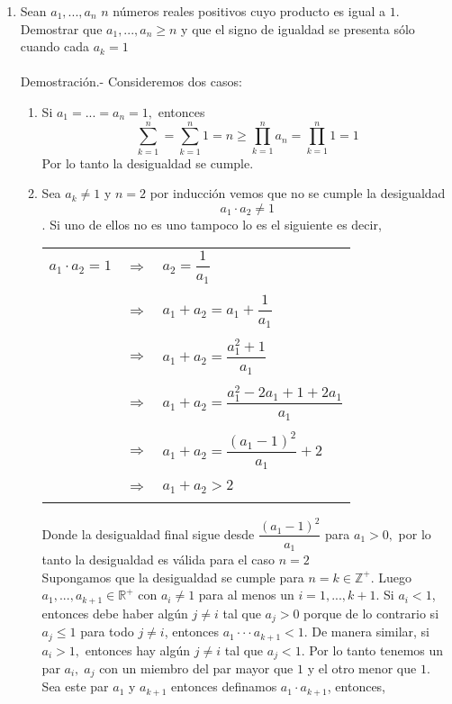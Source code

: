 \begin{enumerate}
\item Sean $a_1,...,a_n$  $n$ números reales positivos cuyo producto es igual a $1$. Demostrar que $a_1,...,a_n \geq n$ y que el signo de igualdad se presenta sólo cuando cada $a_k =1$\\\\
Demostración.- \; Consideremos dos casos:
\begin{enumerate}[C1]
\item Si $a_1=...=a_n=1,$ entonces 
$$\sum\limits_{k=1}^n = \sum\limits_{k=1}^n 1 = n \geq \prod\limits_{k=1}^n a_n = \prod\limits_{k=1}^n 1 = 1 $$
Por lo tanto la desigualdad se cumple.
\item Sea $a_k \neq 1$ y $n=2$ por inducción vemos que no se cumple la desigualdad $$a_1 \cdot a_2 \neq 1$$. Si uno de ellos no es uno tampoco lo es el siguiente es decir,
\begin{center}
\begin{tabular}{rcl}
$a_1 \cdot a_2 = 1$&$\Rightarrow$&$a_2 = \dfrac{1}{a_1}$\\\\
&$\Rightarrow$&$a_1 + a_2 = a_1 + \dfrac{1}{a_1}$\\\\
&$\Rightarrow$&$a_1 + a_2=\dfrac{a_1^2 + 1}{a_1}$\\\\
&$\Rightarrow$&$a_1 + a_2=\dfrac{a_1^2 - 2a_1 + 1 +2a_1}{a_1}$\\\\
&$\Rightarrow$&$a_1 + a_2=\dfrac{(a_1 - 1)^2}{a_1} + 2$\\\\
&$\Rightarrow$&$a_1 + a_2 > 2$\\\\
\end{tabular}
\end{center}
Donde la desigualdad final sigue desde $\dfrac{(a_1-1)^2}{a_1}$ para $a_1>0,$ por lo tanto la desigualdad es válida para el caso $n=2$\\
Supongamos que la desigualdad se cumple para $n=k \in \mathbb{Z}^+$. Luego $a_1,...,a_{k+1} \in \mathbb{R}^+$ con $a_i \neq 1$ para al menos un $i=1,...,k+1.$ Si $a_i < 1$, entonces debe haber algún $j\neq i$ tal que $a_j > 0$ porque de lo contrario si $a_j \leq 1$ para  todo $j\neq i$, entonces $a_1 \cdot \cdot \cdot a_{k+1}<1.$ De manera similar, si $a_i>1,$ entonces hay algún $j\neq i$ tal que $a_j <1.$ Por lo tanto tenemos un par $a_i, \; a_j$ con un miembro del par mayor que $1$ y el otro menor que $1$. Sea este par $a_1$ y $a_{k+1}$ entonces definamos $a_1 \cdot a_{k+1}$, entonces,

\end{enumerate}
\end{enumerate}
